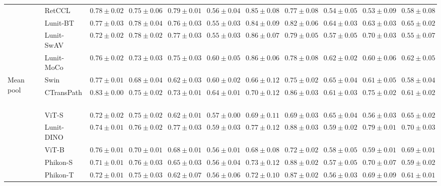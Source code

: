 \begin{tabular}{ll|cccc|c|cccc}
 & RetCCL~\cite{wang2023retccl} & $0.78 \pm 0.02$ & $0.75 \pm 0.06$ & $\mathbf{0.79 \pm 0.01}$ & $0.56 \pm 0.04$ & $0.85 \pm 0.08$ & $0.77 \pm 0.08$ & $0.54 \pm 0.05$ & $0.53 \pm 0.09$ & $0.58 \pm 0.08$ \\
 & Lunit-BT~\cite{kang2023benchmarking} & $0.77 \pm 0.03$ & $0.78 \pm 0.04$ & $0.76 \pm 0.03$ & $0.55 \pm 0.03$ & $0.84 \pm 0.09$ & $0.82 \pm 0.06$ & $\mathbf{0.64 \pm 0.03}$ & $0.63 \pm 0.03$ & $0.65 \pm 0.02$ \\
 & Lunit-SwAV~\cite{kang2023benchmarking} & $0.72 \pm 0.02$ & $\mathbf{0.78 \pm 0.02}$ & $0.77 \pm 0.03$ & $0.55 \pm 0.03$ & $0.86 \pm 0.07$ & $0.79 \pm 0.05$ & $0.57 \pm 0.05$ & $0.70 \pm 0.03$ & $0.55 \pm 0.07$ \\
 & Lunit-MoCo~\cite{kang2023benchmarking} & $0.76 \pm 0.02$ & $0.73 \pm 0.03$ & $0.75 \pm 0.03$ & $0.60 \pm 0.05$ & $0.86 \pm 0.06$ & $0.78 \pm 0.08$ & $0.62 \pm 0.02$ & $0.60 \pm 0.06$ & $0.62 \pm 0.05$ \\
\cline{1-11}
\multirow[t]{12}{*}{Mean pool} & Swin~\cite{liu2021swin} & $0.77 \pm 0.01$ & $0.68 \pm 0.04$ & $0.62 \pm 0.03$ & $0.60 \pm 0.02$ & $0.66 \pm 0.12$ & $0.75 \pm 0.02$ & $0.65 \pm 0.04$ & $0.61 \pm 0.05$ & $0.58 \pm 0.04$ \\
 & CTransPath~\cite{wang2022transformer} & $\mathbf{0.83 \pm 0.00}$ & $0.75 \pm 0.02$ & $0.73 \pm 0.01$ & $\mathbf{0.64 \pm 0.01}$ & $0.70 \pm 0.12$ & $0.86 \pm 0.03$ & $0.61 \pm 0.03$ & $0.75 \pm 0.02$ & $0.61 \pm 0.02$ \\
 & ViT-S~\cite{kolesnikov2021image} & $0.72 \pm 0.02$ & $0.75 \pm 0.02$ & $0.62 \pm 0.01$ & $0.57 \pm 0.00$ & $0.69 \pm 0.11$ & $0.69 \pm 0.03$ & $0.65 \pm 0.04$ & $0.56 \pm 0.03$ & $0.65 \pm 0.02$ \\
 & Lunit-DINO~\cite{kang2023benchmarking} & $0.74 \pm 0.01$ & $0.76 \pm 0.02$ & $\mathbf{0.77 \pm 0.03}$ & $0.59 \pm 0.03$ & $\mathbf{0.77 \pm 0.12}$ & $\mathbf{0.88 \pm 0.03}$ & $0.59 \pm 0.02$ & $\mathbf{0.79 \pm 0.01}$ & $\mathbf{0.70 \pm 0.03}$ \\
 & ViT-B~\cite{kolesnikov2021image} & $0.76 \pm 0.01$ & $0.70 \pm 0.01$ & $0.68 \pm 0.01$ & $0.56 \pm 0.01$ & $0.68 \pm 0.08$ & $0.72 \pm 0.02$ & $0.58 \pm 0.05$ & $0.59 \pm 0.01$ & $0.69 \pm 0.01$ \\
 & Phikon-S~\cite{filiot2023scaling} & $0.71 \pm 0.01$ & $0.76 \pm 0.03$ & $0.65 \pm 0.03$ & $0.56 \pm 0.04$ & $0.73 \pm 0.12$ & $0.88 \pm 0.02$ & $0.57 \pm 0.05$ & $0.70 \pm 0.07$ & $0.59 \pm 0.02$ \\
 & Phikon-T~\cite{filiot2023scaling} & $0.72 \pm 0.01$ & $0.75 \pm 0.03$ & $0.62 \pm 0.07$ & $0.56 \pm 0.06$ & $0.72 \pm 0.10$ & $0.87 \pm 0.02$ & $0.56 \pm 0.03$ & $0.69 \pm 0.09$ & $0.61 \pm 0.01$ \\

\end{tabular}
